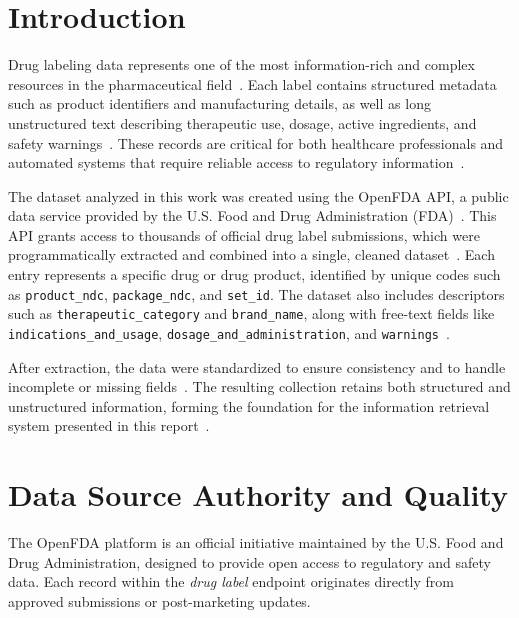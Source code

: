 

\section{Introduction}
Drug labeling data represents one of the most information-rich and complex resources in the pharmaceutical field~\cite{fang2016druglabel,nature_fdalabel}. Each label contains structured metadata such as product identifiers and manufacturing details, as well as long unstructured text describing therapeutic use, dosage, active ingredients, and safety warnings~\cite{nature_fdalabel,fda_fdalabel}. These records are critical for both healthcare professionals and automated systems that require reliable access to regulatory information~\cite{fang2016druglabel,fda_fdalabel}.

The dataset analyzed in this work was created using the OpenFDA API, a public data service provided by the U.S. Food and Drug Administration (FDA)~\cite{openfdaapi,acm_openfda}. This API grants access to thousands of official drug label submissions, which were programmatically extracted and combined into a single, cleaned dataset~\cite{openfdaapi,fda_fdalabel,frontiers_extraction}. Each entry represents a specific drug or drug product, identified by unique codes such as \texttt{product\_ndc}, \texttt{package\_ndc}, and \texttt{set\_id}. The dataset also includes descriptors such as \texttt{therapeutic\_category} and \texttt{brand\_name}, along with free-text fields like \texttt{indications\allowbreak\_and\allowbreak\_usage}, \texttt{dosage\allowbreak\_and\allowbreak\_administration}, and \texttt{warnings}~\cite{frontiers_extraction,liu_dli}.


After extraction, the data were standardized to ensure consistency and to handle incomplete or missing fields~\cite{liu_dli,nature_fdalabel}. The resulting collection retains both structured and unstructured information, forming the foundation for the information retrieval system presented in this report~\cite{fang2016druglabel,nature_fdalabel}.


\section{Data Source Authority and Quality}
The OpenFDA platform is an official initiative maintained by the U.S. Food and Drug Administration, designed to provide open access to regulatory and safety data. Each record within the \textit{drug label} endpoint originates directly from approved submissions or post-marketing updates.

